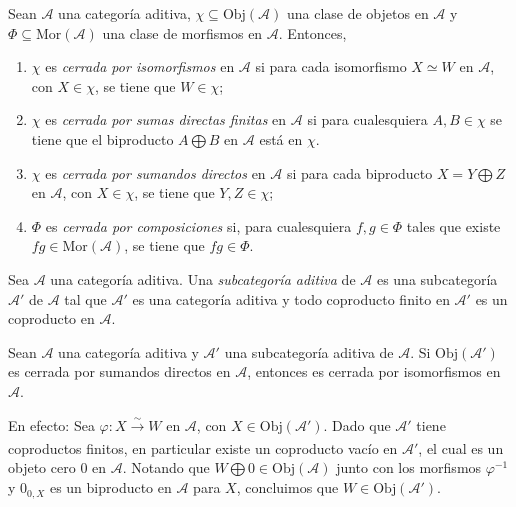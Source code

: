\documentclass[tesis]{subfiles}
\begin{document}
\begin{Def}\label{Def: Cerraduras}
    Sean $\mathscr{A}$ una categoría aditiva, $\chi\subseteq\text{Obj}(\mathscr{A})$ una clase de objetos en $\mathscr{A}$ y $\Phi\subseteq\text{Mor}(\mathscr{A})$ una clase de morfismos en $\mathscr{A}$. Entonces,

    \begin{enumerate}[label=(\alph*)]
    
        \item $\chi$ es \emph{cerrada por isomorfismos} en $\mathscr{A}$ si para cada isomorfismo $X\simeq W$ en $\mathscr{A}$, con $X\in\chi$, se tiene que $W\in\chi$;

        \item $\chi$ es \emph{cerrada por sumas directas finitas} en $\mathscr{A}$ si para cualesquiera $A,B\in\chi$ se tiene que el biproducto $A\bigoplus B$ en $\mathscr{A}$ está en $\chi$.

        \item $\chi$ es \emph{cerrada por sumandos directos} en $\mathscr{A}$ si para cada biproducto $X=Y\bigoplus Z$ en $\mathscr{A}$, con $X\in\chi$, se tiene que $Y,Z\in\chi$;

        \item $\Phi$ es \emph{cerrada por composiciones} si, para cualesquiera $f,g\in \Phi$ tales que existe $fg\in\text{Mor}(\mathscr{A})$, se tiene que $fg\in \Phi$.
    \end{enumerate}
\end{Def}

\begin{Def}\label{Def: Subcategoría aditiva}
    Sea $\mathscr{A}$ una categoría aditiva. Una \emph{subcategoría aditiva} de $\mathscr{A}$ es una subcategoría $\mathscr{A}'$ de $\mathscr{A}$ tal que $\mathscr{A}'$ es una categoría aditiva y todo coproducto finito en $\mathscr{A}'$ es un coproducto en $\mathscr{A}$.
\end{Def}

\begin{Obs}\label{Obs: Subcategoría aditiva}

    Sean $\mathscr{A}$ una categoría aditiva y $\mathscr{A}'$ una subcategoría aditiva de $\mathscr{A}$. Si $\text{Obj}(\mathscr{A}')$ es cerrada por sumandos directos en $\mathscr{A}$, entonces es cerrada por isomorfismos en $\mathscr{A}$.

    \vspace{1mm}
    En efecto: Sea $\varphi:X\xrightarrow[]{\sim}W$ en $\mathscr{A}$, con $X\in\text{Obj}(\mathscr{A}')$. Dado que $\mathscr{A}'$ tiene coproductos finitos, en particular existe un coproducto vacío en $\mathscr{A}'$, el cual es un objeto cero $0$ en $\mathscr{A}$. Notando que $W\bigoplus0\in\text{Obj}(\mathscr{A})$ junto con los morfismos $\varphi^{-1}$ y $0_{0,X}$ es un biproducto en $\mathscr{A}$ para $X$, concluimos que $W\in\text{Obj}(\mathscr{A}')$.
\end{Obs}
\end{document}

